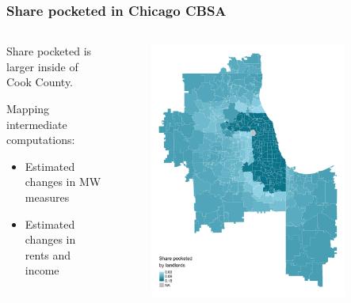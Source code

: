 \documentclass[aspectratio=169, t]{beamer}
\begin{document}
\begin{frame}[label=share_pocketed]
    \frametitle{Share pocketed in Chicago CBSA}

    \begin{columns}
        \begin{column}{0.45\textwidth}

            Share pocketed is larger inside of Cook County.

            \vspace{3mm}
            Mapping intermediate computations:
            \begin{itemize}
                \item Estimated changes in MW measures \hyperlink{changes_mw_measures}{}
                \item Estimated changes in rents and income \hyperlink{changes_rents_inc}{}
            \end{itemize}
                        
        \end{column}
        \begin{column}{0.55\textwidth}
            \vspace{-16mm}
            \begin{figure}
                \centering
                \includegraphics[width = 0.87\textwidth]{counterfactuals/output/chicago_rho.png}
            \end{figure}   
        \end{column}
    \end{columns}
    
\end{frame}
\end{document}
